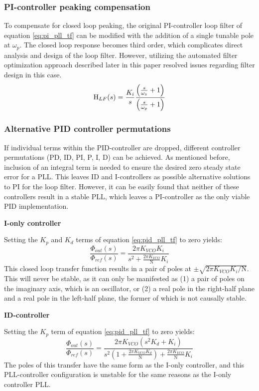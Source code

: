 		\subsubsection{PI-controller peaking compensation}
			 To compensate for closed loop peaking, the original PI-controller loop filter of equation \ref{eq:pi_pll_tf} can be modified with the addition of a single tunable pole at $\omega_p$. The closed loop response becomes third order, which complicates direct analysis and design of the loop filter. However, utilizing the automated filter optimization approach described later in this paper resolved issues regarding filter design in this case.
			\begin{equation} \label{eq:pi_compensated_tf}
				\textnormal{H}_{LF}(s) = \frac{K_i}{s}\frac{\left(\frac{s}{\omega_z} + 1\right)}{\left(\frac{s}{\omega_p} + 1\right)}
			\end{equation}

		\subsubsection{Alternative PID controller permutations} \label{other_pid}
			If individual terms within the PID-controller are dropped, different controller permutations (PD, ID, PI, P, I, D) can be achieved. As mentioned before, inclusion of an integral term is needed to ensure the desired zero steady state error for a PLL. This leaves ID and I-controllers as possible alternative solutions to PI for the loop filter. However, it can be easily found that neither of these controllers result in a stable PLL, which leaves a PI-controller as the only viable PID implementation.

			\textbf{I-only controller}

			Setting the $K_p$ and $K_d$ terms of equation \ref{eq:pid_pll_tf} to zero yields:
			\begin{equation}
				\frac{\Phi_{out}(s)}{\Phi_{ref}(s)} = \frac{2\pi K_{VCO}K_i}{s^2 + \frac{2\pi K_{VCO}}{\mathrm{N}}K_i}
			\end{equation}
			This closed loop transfer function results in a pair of poles at $\pm\sqrt{2\pi K_{VCO}K_i/\mathrm{N}}$. This will never be stable, as it can only be manifested as (1) a pair of poles on the imaginary axis, which is an oscillator, or (2) a real pole in the right-half plane and a real pole in the left-half plane, the former of which is not causally stable.

			\textbf{ID-controller}

			Setting the $K_p$ term of equation \ref{eq:pid_pll_tf} to zero yields:
			\begin{equation}
				\frac{\Phi_{out}(s)}{\Phi_{ref}(s)} = \frac{2\pi K_{VCO}\left(s^2K_d + K_i\right)}{s^2\left(1 + \frac{2\pi K_{VCO}K_d}{\mathrm{N}}\right) + \frac{2\pi K_{VCO}}{\mathrm{N}} K_i}
			\end{equation}
			The poles of this transfer have the same form as the I-only controller, and this PLL-controller configuration is unstable for the same reasons as the I-only controller PLL.